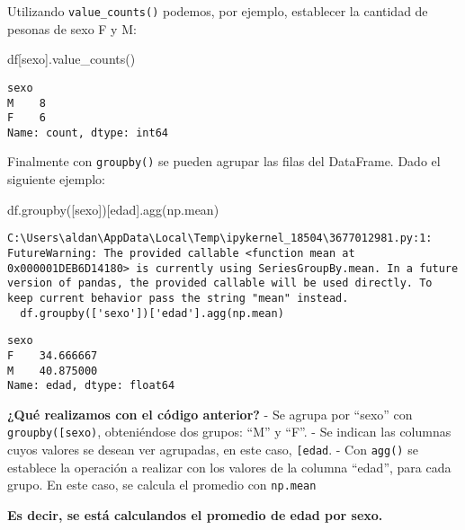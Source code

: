 \documentclass[
  letterpaper,
  DIV=11,
  numbers=noendperiod]{scrreprt}
\newenvironment{Shaded}{\begin{snugshade}}{\end{snugshade}}
\newcommand{\NormalTok}[1]{\textcolor[rgb]{0.00,0.23,0.31}{#1}}
\newcommand{\StringTok}[1]{\textcolor[rgb]{0.13,0.47,0.30}{#1}}
\begin{document}
Utilizando \texttt{value\_counts()} podemos, por ejemplo, establecer la
cantidad de pesonas de sexo F y M:

\begin{Shaded}
\begin{Highlighting}[]
\NormalTok{df[}\StringTok{\textquotesingle{}sexo\textquotesingle{}}\NormalTok{].value\_counts()}
\end{Highlighting}
\end{Shaded}

\begin{verbatim}
sexo
M    8
F    6
Name: count, dtype: int64
\end{verbatim}

Finalmente con \texttt{groupby()} se pueden agrupar las filas del
DataFrame. Dado el siguiente ejemplo:

\begin{Shaded}
\begin{Highlighting}[]
\NormalTok{df.groupby([}\StringTok{\textquotesingle{}sexo\textquotesingle{}}\NormalTok{])[}\StringTok{\textquotesingle{}edad\textquotesingle{}}\NormalTok{].agg(np.mean)}
\end{Highlighting}
\end{Shaded}

\begin{verbatim}
C:\Users\aldan\AppData\Local\Temp\ipykernel_18504\3677012981.py:1: FutureWarning: The provided callable <function mean at 0x000001DEB6D14180> is currently using SeriesGroupBy.mean. In a future version of pandas, the provided callable will be used directly. To keep current behavior pass the string "mean" instead.
  df.groupby(['sexo'])['edad'].agg(np.mean)
\end{verbatim}

\begin{verbatim}
sexo
F    34.666667
M    40.875000
Name: edad, dtype: float64
\end{verbatim}

\textbf{¿Qué realizamos con el código anterior?} - Se agrupa por
``sexo'' con
\texttt{groupby({[}\textquotesingle{}sexo\textquotesingle{}{]})},
obteniéndose dos grupos: ``M'' y ``F''. - Se indican las columnas cuyos
valores se desean ver agrupadas, en este caso,
\texttt{{[}\textquotesingle{}edad\textquotesingle{}{]}}. - Con
\texttt{agg()} se establece la operación a realizar con los valores de
la columna ``edad'', para cada grupo. En este caso, se calcula el
promedio con \texttt{np.mean}

\textbf{Es decir, se está calculandos el promedio de edad por sexo.}
\end{document}
